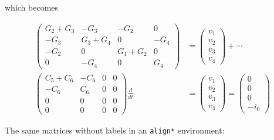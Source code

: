 \documentclass[%
oneside,                 %
final,                   %
10pt]{article}
\begin{document}
\elatexcod


which becomes

\begin{align}
\begin{pmatrix}
G_2 + G_3 & -G_3 & -G_2 & 0 \\ 
-G_3 & G_3 + G_4 & 0 & -G_4 \\ 
-G_2 & 0 & G_1 + G_2 & 0 \\ 
0 & -G_4 & 0 & G_4
\end{pmatrix}
&=
\begin{pmatrix}
v_1 \\ 
v_2 \\ 
v_3 \\ 
v_4
\end{pmatrix}
+ \cdots
\label{_mymatrixeq}\\ 
\begin{pmatrix}
C_5 + C_6 & -C_6 & 0 & 0 \\ 
-C_6 & C_6 & 0 & 0 \\ 
0 & 0 & 0 & 0 \\ 
0 & 0 & 0 & 0
\end{pmatrix}
\frac{d}{dt} &=
\begin{pmatrix}
v_1 \\ 
v_2 \\ 
v_3 \\ 
v_4
\end{pmatrix} =
\begin{pmatrix}
0 \\ 
0 \\ 
0 \\ 
-i_0
\end{pmatrix}
\end{align}

The same matrices without labels in an \texttt{align*} environment:
\end{document}
